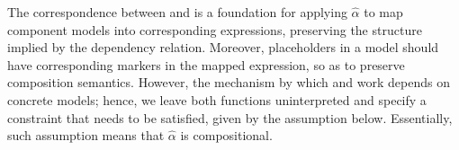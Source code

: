 







The correspondence between  and  is a foundation for applying $\hat{\alpha}$ to map component models into corresponding expressions, preserving the structure implied by the dependency relation.
Moreover, placeholders in a model should have corresponding markers in the mapped expression, so as to preserve composition semantics.
However, the mechanism by which  and  work depends on concrete models; hence, we leave both functions uninterpreted and specify a constraint that needs to be satisfied, given by the assumption below.
Essentially, such assumption means that $\hat{\alpha}$ is compositional.

